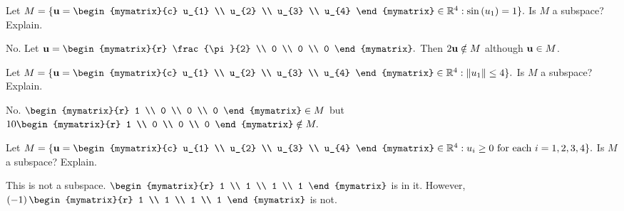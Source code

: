 \begin{enumialphparenastyle}
\begin{ex} Let $M=\set{\vect{u}=\begin{mymatrix}{c}
u_{1} \\
u_{2} \\
u_{3} \\
u_{4}
\end{mymatrix} \in 
\R^{4}:\sin \left( u_{1}\right) =1} .$ Is $M$ a subspace?
Explain.
\begin{sol}
No. Let $\vect{u}=\begin{mymatrix}{r}
\frac{\pi }{2} \\
0 \\
0 \\
0
\end{mymatrix} .$ Then $2{\bf u}\notin M$ although ${\bf u}\in M$.
\end{sol}
\end{ex}

\begin{ex} Let $M=\set{\vect{u}=\begin{mymatrix}{c}
u_{1} \\
u_{2} \\
u_{3} \\
u_{4}
\end{mymatrix} \in 
\R^{4}:\vectlength u_{1}\vectlength \leq 4} .$ Is $M$ a
subspace? Explain.
\begin{sol}
No. $\begin{mymatrix}{r}
1 \\
0 \\
0 \\
0
\end{mymatrix} \in M$ but $10\begin{mymatrix}{r}
1 \\
0 \\
0 \\
0
\end{mymatrix} \notin M.$
\end{sol}
\end{ex}

\begin{ex} Let $M=\set{\vect{u}=\begin{mymatrix}{c}
u_{1} \\
u_{2} \\
u_{3} \\
u_{4}
\end{mymatrix} \in 
\R^{4}:u_{i}\geq 0\text{ for each }i=1,2,3,4} .$ Is $M$ a
subspace? Explain.
\begin{sol}
This is not a subspace. $\begin{mymatrix}{r}
1 \\
1 \\
1 \\
1
\end{mymatrix} $
is in it. However, $\left( -1\right) \begin{mymatrix}{r}
1 \\
1 \\
1 \\
1
\end{mymatrix} $ is not.
\end{sol}
\end{ex}


\end{enumialphparenastyle}
